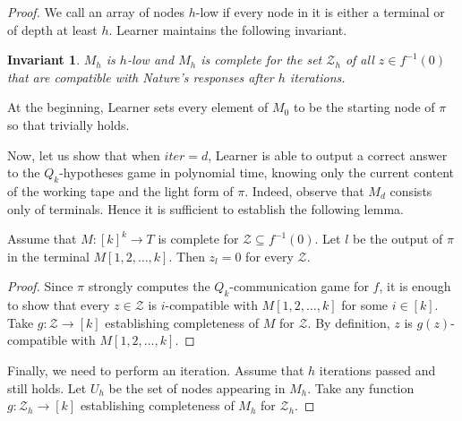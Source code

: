 \documentclass{toc}
\newtheorem{invariant}[theorem]{Invariant}
\begin{document}
\begin{proof}
We call an array of nodes $h$-low if every node in it is either a terminal or of depth at least $h$. Learner maintains the following invariant.
 

\begin{invariant}
\label{invar2}
$M_h$ is $h$-low and $M_h$ is complete for the set $\mathcal{Z}_h$ of all $z\in f^{-1}(0)$ that are compatible with Nature's responses after $h$ iterations.
\end{invariant}

At the beginning, Learner sets every element of  $M_0$ to be the starting node of $\pi$ so that  trivially holds.

Now, let us show that when $iter = d$, Learner is able to output a correct answer to the $Q_k$-hypotheses game in polynomial time, knowing only the current content of the working tape and the light form of $\pi$. Indeed, observe that $M_d$ consists only of terminals. Hence it is sufficient to establish the following lemma.

\begin{lemma}
\label{complete_lemma_2}
Assume that $M\colon [k]^k \to T$ is complete for $\mathcal{Z}\subseteq f^{-1}(0)$. Let $l$ be the output of $\pi$ in the terminal $M[1, 2, \ldots, k]$. Then $z_l = 0$ for every $\mathcal{Z}$.
\end{lemma}
\begin{proof}
Since $\pi$ strongly computes the $Q_k$-communication game for $f$, it is enough to show that every $z\in\mathcal{Z}$ is $i$-compatible with $M[1, 2, \ldots, k]$ for some $i\in[k]$. Take $g\colon \mathcal{Z} \to [k]$ establishing completeness of $M$ for $\mathcal{Z}$. By definition, $z$ is $g(z)$-compatible with $M[1, 2, \ldots, k]$.
\end{proof}

Finally, we need to perform an iteration. Assume that $h$ iterations passed and  still holds. Let $U_h$ be the set of nodes appearing in $M_h$. Take any function $g\colon \mathcal{Z}_h \to [k]$ establishing completeness of $M_h$ for $\mathcal{Z}_h$.


\end{proof}
\end{document}
